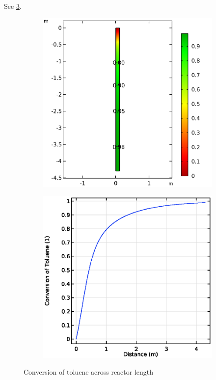 See \cref{fig:comsol-conversion}.

\begin{figure}[h]
    \centering

    \begin{subfigure}{0.49\linewidth}
        \includegraphics[width=\linewidth, scale=0.5]{figures/conversion-surface.png}

        \label{fig:comsol-conversion:surface}
    \end{subfigure}
    \begin{subfigure}{0.49\linewidth}
        \includegraphics[width=\linewidth, scale=0.5]{figures/conversion-line.eps}

        \label{fig:comsol-conversion:line}
    \end{subfigure}

    \caption{Conversion of toluene across reactor length}
    \label{fig:comsol-conversion}
\end{figure}
